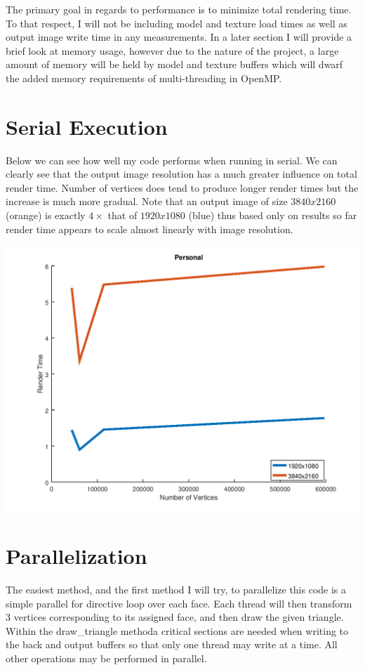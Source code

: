 \documentclass[12pt]{article}
\begin{document}
The primary goal in regards to performance is to minimize total rendering time. To that respect, I will
not be including model and texture load times as well as output image write time in any measurements. 
In a later section I will provide a brief look at memory usage, however due to the nature of the project, a
large amount of memory will be held by model and texture buffers which will dwarf the added memory requirements
of multi-threading in OpenMP.

\section*{Serial Execution}

Below we can see how well my code performs when running in serial. We can clearly see that the output
image resolution has a much greater influence on total render time. Number of vertices does tend to
produce longer render times but the increase is much more gradual. Note that an output image of 
size $3840x2160$ (orange) is exactly $4\times$ that of $1920x1080$ (blue) thus based only on results so far
render time appears to scale almost linearly with image resolution.

\includegraphics[scale=0.65]{serial_personal.png}

\section*{Parallelization}

The easiest method, and the first method I will try, to parallelize this code is a simple parallel for
directive loop over each face. Each thread will then transform 3 vertices corresponding to its assigned
face, and then draw the given triangle. Within the draw_triangle methoda critical sections are needed
when writing to the back and output buffers so that only one thread may write at a time. All other
operations may be performed in parallel.
\end{document}
